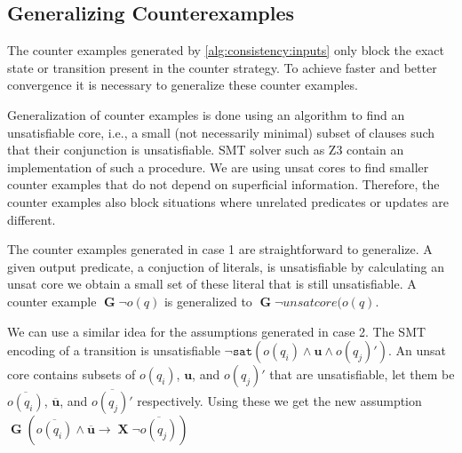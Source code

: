 \documentclass[runningheads]{llncs}
\newcommand{\globally}{\operatorname{\mathbf{G}}}
\newcommand{\lnext}{\operatorname{\mathbf{X}}}
\newcommand{\theory}{\mathcal{T}}
\newcommand{\bool}{\mathcal{B}}
\newcommand{\updf}{\mathbf{u}}
\newcommand{\sat}[1]{\texttt{sat}(#1)}
\begin{document}


\subsection{Generalizing Counterexamples}
\label{sec:opt:general:ce}
The counter examples generated by \cref{alg:consistency:inputs} only block the exact state or transition present in the counter strategy.
To achieve faster and better convergence it is necessary to generalize these counter examples.

Generalization of counter examples is done using an algorithm to find an unsatisfiable core, i.e., a small (not necessarily minimal) subset of clauses such that their conjunction is unsatisfiable. SMT solver such as Z3 \cite{demoura2008} contain an implementation of such a procedure.
We are using unsat cores to find smaller counter examples that do not depend on superficial information. 
Therefore, the counter examples also block situations where unrelated predicates or updates are different.

The counter examples generated in case 1 are straightforward to generalize. A given output predicate, a conjuction of literals, is unsatisfiable by calculating an unsat core we obtain a small set of these literal that is still unsatisfiable.
A counter example $\globally \neg o(q)$ is generalized to $\globally \neg unsatcore(o(q)$.

We can use a similar idea for the assumptions generated in case 2. 
The SMT encoding of a transition is unsatisfiable $\neg \sat{ o(q_i) \land \updf \land  o(q_j)' }$. An unsat core contains subsets of $o(q_i)$, $\updf$, and $o(q_j)'$ that are unsatisfiable, let them be $\overline{o(q_i)}$, $\overline{\updf}$, and $\overline{o(q_j)'}$ respectively. Using these we get the new assumption $\globally ( \overline{o(q_i)} \land \overline{\updf} \rightarrow \lnext \neg \overline{o(q_j)})$
\end{document}
